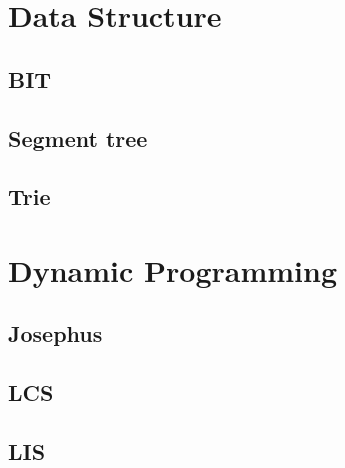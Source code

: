 \section{Data Structure}
        \subsection{BIT}
                
        \subsection{Segment tree}
                
        \subsection{Trie}
                

\section{Dynamic Programming} 
        \subsection{Josephus}
                
        \subsection{LCS}
                
        \subsection{LIS}
                  

